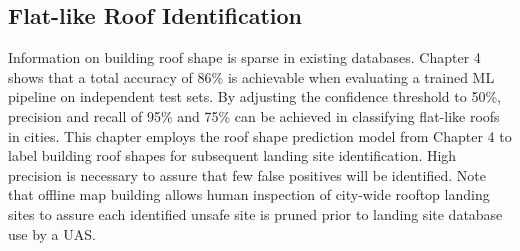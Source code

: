 \subsection{Flat-like Roof Identification}\label{sec:ch5_flat_like}
Information on building roof shape is sparse in existing  databases. Chapter 4 shows that a total accuracy of 86\% is achievable when evaluating a trained \ac{ML} pipeline on independent test sets. By adjusting the confidence threshold to 50\%, precision and recall of 95\% and 75\% can be achieved in classifying flat-like roofs in cities.  This chapter employs the roof shape prediction model from Chapter 4 to label building roof shapes for subsequent landing site identification. High precision is necessary to assure that few false positives will be identified. Note that offline map building allows  human inspection of city-wide rooftop landing sites to assure each identified unsafe site is pruned prior to landing site database use by a UAS.

